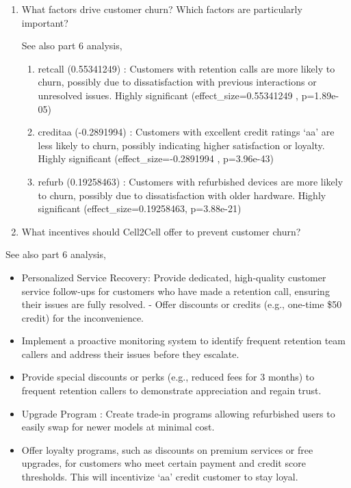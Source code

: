 \documentclass[
]{article}
\begin{document}
\begin{enumerate}
\def\labelenumi{\arabic{enumi}.}
\setcounter{enumi}{1}
\item
  What factors drive customer churn? Which factors are particularly
  important?

  See also part 6 analysis,

  \begin{enumerate}
  \def\labelenumii{\arabic{enumii}.}
  \item
    retcall (0.55341249) : Customers with retention calls are more
    likely to churn, possibly due to dissatisfaction with previous
    interactions or unresolved issues. Highly significant
    (effect\_size=0.55341249 , p=1.89e-05)
  \item
    creditaa (-0.2891994) : Customers with excellent credit ratings `aa'
    are less likely to churn, possibly indicating higher satisfaction or
    loyalty. Highly significant (effect\_size=-0.2891994 , p=3.96e-43)
  \item
    refurb (0.19258463) : Customers with refurbished devices are more
    likely to churn, possibly due to dissatisfaction with older
    hardware. Highly significant (effect\_size=0.19258463, p=3.88e-21)
  \end{enumerate}
\item
  What incentives should Cell2Cell offer to prevent customer churn?
\end{enumerate}

See also part 6 analysis,

\begin{itemize}
\item
  Personalized Service Recovery: Provide dedicated, high-quality
  customer service follow-ups for customers who have made a retention
  call, ensuring their issues are fully resolved. - Offer discounts or
  credits (e.g., one-time \$50 credit) for the inconvenience.
\item
  Implement a proactive monitoring system to identify frequent retention
  team callers and address their issues before they escalate.
\item
  Provide special discounts or perks (e.g., reduced fees for 3 months)
  to frequent retention callers to demonstrate appreciation and regain
  trust.
\item
  Upgrade Program : Create trade-in programs allowing refurbished users
  to easily swap for newer models at minimal cost.
\item
  Offer loyalty programs, such as discounts on premium services or free
  upgrades, for customers who meet certain payment and credit score
  thresholds. This will incentivize `aa' credit customer to stay loyal.
\end{itemize}
\end{document}
